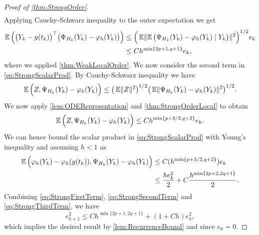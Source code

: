 \documentclass[10pt]{article}
\begin{document}
\begin{proof}[Proof of \cref{thm:StrongOrder}]
\begin{equation}
\begin{aligned}
	\end{aligned}
	\end{equation}
	Applying Cauchy-Schwarz inequality to the outer expectation we get
	\begin{equation}
	\begin{aligned}
		\operatorname{\mathbb{E}}\Big(\big(Y_k - y(t_k)\big)^\top \big(\Psi_{H_k}(Y_k) - \varphi_{h}(Y_k)\big)\Big) &\leq \Big(\operatorname{\mathbb{E}}\lVert\operatorname{\mathbb{E}}\big(\Psi_{H_k}(Y_k) - \varphi_{h}(Y_k) \mid Y_k\big)\rVert^{2}\Big)^{1/2}e_k  \\
		&\leq  Ch^{\min\{2p+1, q+1\}}e_k,
	\end{aligned}
	\end{equation}
	where we applied \cref{thm:WeakLocalOrder}. We now consider the second term in \eqref{eq:StrongScalarProd}. By Cauchy-Schwarz inequality we have
	\begin{equation}
		\operatorname{\mathbb{E}}\Big(Z, \Psi_{H_k}(Y_k) - \varphi_{h}(Y_k)\Big) \leq \big(\operatorname{\mathbb{E}}\lVert Z\rVert^{2}\big)^{1/2} \big(\operatorname{\mathbb{E}}\lVert\Psi_{H_k}(Y_k) - \varphi_{h}(Y_k)\rVert^2\big)^{1/2}.
	\end{equation}
	We now apply \cref{lem:ODERepresentation} and \cref{thm:StrongOrderLocal} to obtain
	\begin{equation}
		\operatorname{\mathbb{E}}\Big(Z, \Psi_{H_k}(Y_k) - \varphi_{h}(Y_k)\Big) \leq C h^{\min\{p+3/2, q+2\}} e_k.
	\end{equation}
	We can hence bound the scalar product in \eqref{eq:StrongScalarProd} with Young's inequality and assuming $h < 1$ as
	\begin{equation}\label{eq:StrongThirdTerm}
	\begin{aligned}
		\operatorname{\mathbb{E}}\Big(\varphi_{h}(Y_k) - \varphi_{h}(y(t_k)), \Psi_{H_k}(Y_k) - \varphi_{h}(Y_k)\Big) &\leq C(h^{\min\{p+3/2, q+2\}})e_k \\
		&\leq \frac{he_k^2}{2} + C\frac{h^{\min\{2p+2,2q+1\}}}{2}.
	\end{aligned}
	\end{equation}
	Combining \eqref{eq:StrongFirstTerm}, \eqref{eq:StrongSecondTerm} and \eqref{eq:StrongThirdTerm}, we have
	\begin{equation}
		e_{k+1}^2 \leq Ch^{\min\{2p+1, 2q+1\}} + (1 + Ch)e_k^2,
	\end{equation}
	which implies the desired result by \cref{lem:RecurrenceBound} and since $e_0 = 0$.
\end{proof}
\end{document}
